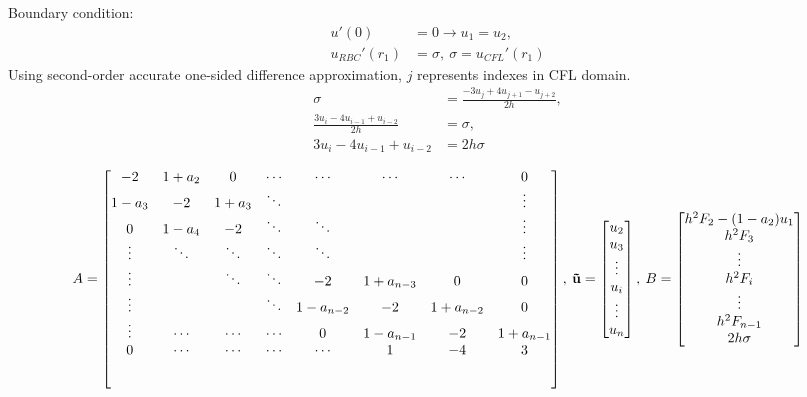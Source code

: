 \documentclass[8pt, a4paper]{article}
\begin{document}
  Boundary condition:
  \begin{align*}
  u'(0)&=0\rightarrow u_1 = u_2,\\
  u_{RBC}'(r_1)&=\sigma,\:\sigma=u_{CFL}'(r_1)
  \end{align*}
  Using second-order accurate one-sided difference approximation, $j$ 
  represents indexes in CFL domain.
  \begin{align*}
  \sigma&=\frac{-3u_j+4u_{j+1}-u_{j+2}}{2h},\\
  \frac{3u_i-4u_{i-1}+u_{i-2}}{2h}&=\sigma,\\
  3u_i-4u_{i-1}+u_{i-2}&=2h\sigma
  \end{align*}
  
  \setlength{\extrarowheight}{1.25\baselineskip}
  \begin{equation}
  A=
  \begin{bmatrix}
  -2 & 1+a_2 & 0 & \cdots & \cdots & \cdots & \cdots & 0\\
  1-a_3 & -2 & 1+a_3 & \ddots & & & & \vdots\\
  0 & 1-a_4 & -2 & \ddots & \ddots & &  & \vdots\\
  \vdots & \ddots & \ddots & \ddots & \ddots & & & \vdots\\
  \vdots & & \ddots & \ddots & -2 & 1+a_{n-3} & 0 & 0 \\
  \vdots & & & \ddots & 1-a_{n-2} & -2 & 1+a_{n-2} & 0\\
  \vdots & \cdots & \cdots & \cdots & 0 & 1-a_{n-1} & -2 & 1+a_{n-1}\\
  0 & \cdots & \cdots & \cdots & \cdots & 1 & -4 & 3\\[5ex]
  \end{bmatrix},\:
  \mathbf{\vec{u}}=
  \begin{bmatrix}
  u_2\\
  u_3\\
  \vdots\\
  u_i\\
  \vdots\\
  u_n
  \end{bmatrix},\:
  B=
  \begin{bmatrix}
  h^2F_2-(1-a_2)u_1\\
  h^2F_3\\
  \vdots\\
  h^2F_i\\
  \vdots\\
  h^2F_{n-1}\\
  2h\sigma
  \end{bmatrix}
  \end{equation}
\end{document}
